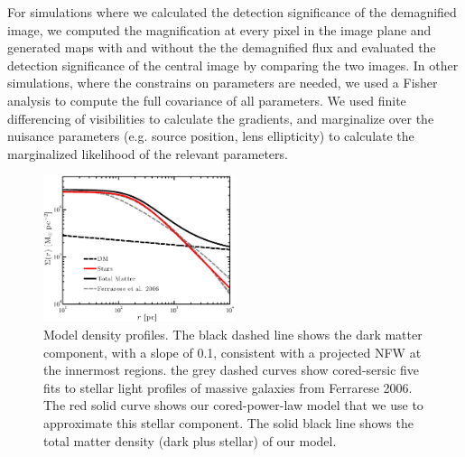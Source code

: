 \documentclass[chicago]{emulateapj}
\begin{document}
For simulations where we calculated the detection significance of the demagnified image, we computed the magnification at every pixel in the image plane and generated maps with and without the the demagnified flux and evaluated the detection significance of the central image by comparing the two images. In other simulations, where the constrains on parameters are needed, we used a Fisher analysis to compute the full covariance of all parameters. 
We used finite differencing of visibilities to calculate the gradients, and marginalize over the nuisance parameters (e.g. source position, lens ellipticity) to calculate the marginalized likelihood of the relevant parameters. 

\begin{figure}
\begin{center}
\centering
\includegraphics[trim= 0 0 5 6, clip, width=0.5\textwidth]{figures/f_01.eps}
\centering
\end{center}
\caption{ Model density profiles. The black dashed line shows the dark matter component, with a slope of 0.1, consistent with a projected NFW at the innermost regions. the grey dashed curves show cored-sersic five fits to stellar light profiles of massive galaxies from Ferrarese 2006. The red solid curve shows our cored-power-law model that we use to approximate this stellar component. The solid black line shows the total matter density (dark plus stellar) of our model. 
\label{fig2}}
\end{figure}

\end{document}

